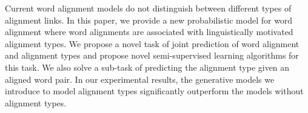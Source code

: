 Current word alignment models do not distinguish between different types of alignment links. In this paper, we provide a new probabilistic model for word alignment where word alignments are associated with linguistically motivated alignment types. We propose a novel task of joint prediction of word alignment and alignment types and propose novel semi-supervised learning algorithms for this task. We also solve a sub-task of predicting the alignment type given an aligned word pair. In our experimental results, the generative models we introduce to model alignment types significantly outperform the models without alignment types.
